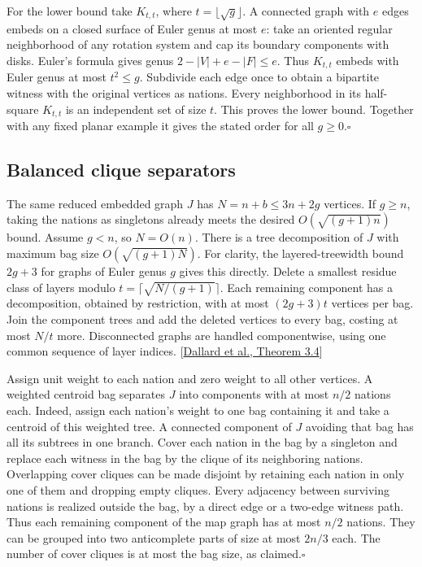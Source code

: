 \documentclass[11pt]{article}
\newcommand{\done}{\hfill\(\square\)}
\begin{document}
For the lower bound take $K_{t,t}$, where $t=\lfloor\sqrt g\rfloor$. A connected graph with $e$ edges embeds on a closed surface of Euler genus at most $e$: take an oriented regular neighborhood of any rotation system and cap its boundary components with disks. Euler's formula gives genus $2-|V|+e-|F|\le e$. Thus $K_{t,t}$ embeds with Euler genus at most $t^2\le g$. Subdivide each edge once to obtain a bipartite witness with the original vertices as nations. Every neighborhood in its half-square $K_{t,t}$ is an independent set of size $t$. This proves the lower bound. Together with any fixed planar example it gives the stated order for all $g\ge0$.\done

\subsection*{Balanced clique separators}
The same reduced embedded graph $J$ has $N=n+b\le3n+2g$ vertices. If $g\ge n$, taking the nations as singletons already meets the desired $O(\sqrt{(g+1)n})$ bound. Assume $g<n$, so $N=O(n)$. There is a tree decomposition of $J$ with maximum bag size $O(\sqrt{(g+1)N})$. For clarity, the layered-treewidth bound $2g+3$ for graphs of Euler genus $g$ gives this directly. Delete a smallest residue class of layers modulo $t=\lceil\sqrt{N/(g+1)}\rceil$. Each remaining component has a decomposition, obtained by restriction, with at most $(2g+3)t$ vertices per bag. Join the component trees and add the deleted vertices to every bag, costing at most $N/t$ more. Disconnected graphs are handled componentwise, using one common sequence of layer indices. [\href{https://arxiv.org/abs/2506.12424}{Dallard et al., Theorem 3.4}]

Assign unit weight to each nation and zero weight to all other vertices. A weighted centroid bag separates $J$ into components with at most $n/2$ nations each. Indeed, assign each nation's weight to one bag containing it and take a centroid of this weighted tree. A connected component of $J$ avoiding that bag has all its subtrees in one branch. Cover each nation in the bag by a singleton and replace each witness in the bag by the clique of its neighboring nations. Overlapping cover cliques can be made disjoint by retaining each nation in only one of them and dropping empty cliques. Every adjacency between surviving nations is realized outside the bag, by a direct edge or a two-edge witness path. Thus each remaining component of the map graph has at most $n/2$ nations. They can be grouped into two anticomplete parts of size at most $2n/3$ each. The number of cover cliques is at most the bag size, as claimed.\done
\end{document}
